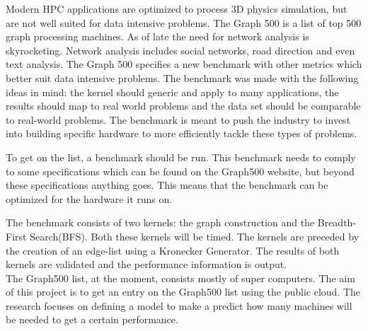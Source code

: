 Modern HPC applications are optimized to process 3D physics simulation, but are not well suited for data intensive problems. The Graph 500 \cite{murphy2010introducing} is a list of top 500 graph processing machines. As of late the need for network analysis is skyrocketing. Network analysis includes social networks, road direction and even text analysis. The Graph 500 specifies a new benchmark with other metrics which better suit data intensive problems. The benchmark was made with the following ideas in mind: the kernel should generic and apply to many applications, the results should map to real world problems and the data set should be comparable to real-world problems. The benchmark is meant to push the industry to invest into building specific hardware to more efficiently tackle these types of problems.

To get on the list, a benchmark should be run. This benchmark needs to comply to some specifications which can be found on the Graph500 website\cite{graph500-specs}, but beyond these specifications anything goes. This means that the benchmark can be optimized for the hardware it runs on. 

The benchmark consists of two kernels: the graph construction and the Breadth-First Search(BFS). Both these kernels will be timed. The kernels are preceded by the creation of an edge-list using a Kronecker Generator\cite{leskovec2010kronecker}. The results of both kernels are validated and the performance information is output.
\\
The Graph500 list, at the moment, consists mostly of super computers. The aim of this project is to get an entry on the Graph500 list using the public cloud. The research focuses on defining a model to make a predict how many machines will be needed to get a certain performance.



